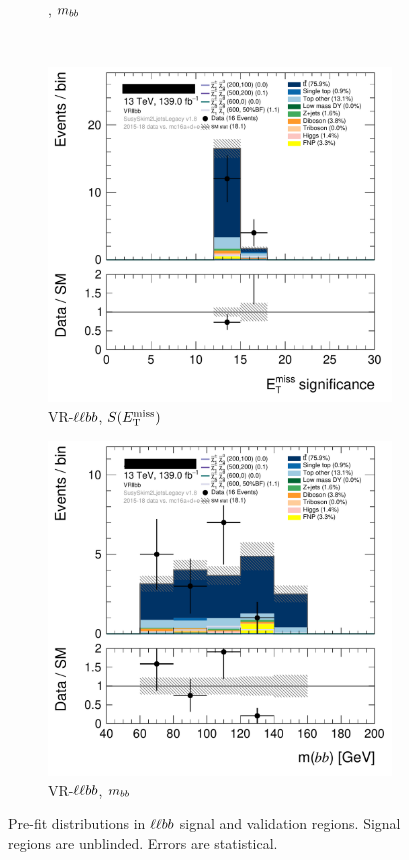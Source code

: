 \begin{figure}[tp]
\begin{subfigure}{0.48\textwidth}
\caption{\srllbb, $m_{bb}$}
\end{subfigure}
\\[0.5em]
\begin{subfigure}{0.48\textwidth}
\centering
\includegraphics[width=\textwidth]{figures/2ljets_def_met_Sign_VRllbb.png}
\caption{VR-$\llbb$, $S(E_\mathrm{T}^\mathrm{miss})$}
\end{subfigure}
\hfill
\begin{subfigure}{0.48\textwidth}
\centering
\includegraphics[width=\textwidth]{figures/2ljets_def_mbb_VRllbb.png}
\caption{VR-$\llbb$, $m_{bb}$}
\end{subfigure}
\caption[
Pre-fit distributions in $\llbb$ signal and validation regions
]{%
Pre-fit distributions in $\llbb$ signal and validation regions.
Signal regions are unblinded.
Errors are statistical.
}
\label{fig:2ljets_high_llbb_region}
\end{figure}

